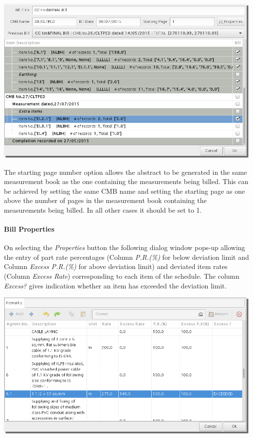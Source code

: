 \documentclass[twoside,a4paper]{refart}
\newenvironment{noteblock}[1]%
{\begin{mdframed}[topline=false,bottomline=false, rightline=false,
		linewidth=2pt, frametitle={#1}]}%
		{\end{mdframed}}
\begin{document}
	 \begin{maxipage}
	 	\includegraphics[width=1\linewidth]{screenshots/window_bill_edit.png}
	 \end{maxipage}
	 
	 \begin{noteblock}{Note:}
	 	The starting page number option allows the abstract to be generated in the same measurement book as the one containing the measurements being billed. This can be achieved by setting the same CMB name and setting the starting page as one above the number of pages in the measurement book containing the measurements being billed. In all other cases it should be set to 1.
	 \end{noteblock}
	 
	 \paragraph{Bill Properties}
	 
	 On selecting the \emph{Properties} button the following dialog window pops-up allowing the entry of part rate percentages (Column \emph{P.R.(\%)} for below deviation limit and Column \emph{Excess P.R.(\%)} for above deviation limit) and deviated item rates (Column \emph{Excess Rate}) corresponding to each item of the schedule. The column \emph{Excess?} gives indication whether an item has exceeded the deviation limit.
	 
	 \begin{maxipage}
	 	\includegraphics[width=1\linewidth]{screenshots/window_bill_prop.png}
	 \end{maxipage}
	 
\end{document}
